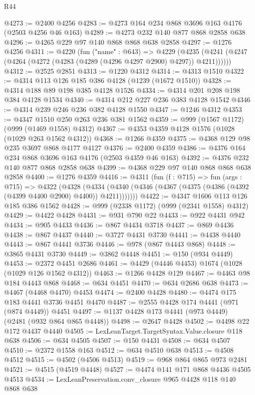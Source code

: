 \begin{lexlean}{R44}
\begin{coremodule}
@4273 := @2400 @4256
@4283 := @4273 @164 @234 @868 @3696 @163 @4176 (@2503 @4256 @46 @163)
@4289 := @4273 @232 @140 @877 @868 @2858 @638
@4296 := @4265 @229 @97 @140 @868 @868 @638 @2858
@4297 := @1276 @4256
@4311 := @4220
    (fun ("name" : @643) =>
    @4229 (@4235 (@4241 (@4247 (@4264 (@4272 (@4283 (@4289 (@4296 @4297 @2900) @4297)) @4211))))))
@4312 := @2525 @2851
@4313 := @1220 @4312
@4314 := @4313 @1510
@4322 := @4314 @113 @126 @185 @386 @4128 (@1239 (@1672 @1510))
@4328 := @4314 @188 @89 @198 @385 @4128 @1526
@4334 := @4314 @201 @208 @198 @384 @4128 @1534
@4340 := @4314 @212 @227 @236 @383 @4128 @1542
@4346 := @4314 @239 @246 @236 @382 @4128 @1550
@4347 := @1246 @4312
@4353 := @4347 @1510 @250 @263 @236 @381 @1562
@4359 := @999 (@1567 @1172) (@999 (@1469 @1558) @4312)
@4367 := @4353 @4359 @4128 @1576 (@1028 (@1029 @263 @1562 @4312))
@4368 := @1266 @4359
@4375 := @4368 @129 @98 @235 @3697 @868 @4177 @4127
@4376 := @2400 @4359
@4386 := @4376 @164 @234 @868 @3696 @163 @4176 (@2503 @4359 @46 @163)
@4392 := @4376 @232 @140 @877 @868 @2858 @638
@4399 := @4368 @229 @97 @140 @868 @868 @638 @2858
@4400 := @1276 @4359
@4416 := @4311
    (fun (f : @715) =>
    fun (args : @715) =>
    @4322
      (@4328
        (@4334 (@4340 (@4346 (@4367 (@4375 (@4386 (@4392 (@4399 @4400 @2900) @4400)) @4211)))))))
@4422 := @4347 @1606 @113 @126 @185 @386 @1562
@4428 := @999 (@2338 @1172) (@999 (@2341 @1558) @4312)
@4429 := @4422 @4428
@4431 := @931 @790 @22
@4433 := @922 @4431 @942
@4434 := @905 @4433
@4436 := @867 @4434 @3718
@4437 := @869 @4436
@4438 := @867 @4437
@4440 := @3727 @4431 @3730
@4441 := @4438 @4440
@4443 := @867 @4441 @3736
@4446 := @978 (@867 @4443 @868)
@4448 := @3865 @4431 @3730
@4449 := @3862 @4448
@4451 := @150 (@934 @4449)
@4453 := @2372 @4451 @2686
@4461 := @4429 (@4446 @4453) @1674 (@1028 (@1029 @126 @1562 @4312))
@4463 := @1266 @4428 @129
@4467 := @4463 @98 @184 @4443 @868
@4468 := @634 @4451
@4470 := @634 @2686 @638
@4473 := @4467 (@4468 @4470) @4453
@4474 := @2400 @4428
@4480 := @4474 @175 @183 @4441 @3736 @4451 @4470
@4487 := @2555 @4428 @174 @4441 (@971 (@874 @4449)) @4451
@4497 := @1137 @4428 @173 @4441 (@973 @4449) (@2481 (@932 @864 @865 @4448))
@4498 := @2647 @4428
@4502 := @4498 @22 @172 @4437 @4440
@4505 := LexLeanTarget.TargetSyntax.Value.closure @118 @638
@4506 := @634 @4505
@4507 := @150 @4431
@4508 := @634 @4507
@4510 := @2372 @1558 @163
@4512 := @634 @4510 @638
@4513 := @4508 @4512
@4515 := @4502 (@4506 @4513)
@4519 := @968 @864 @865 @973 @2481
@4521 := @4515 (@4519 @4448)
@4527 := @4474 @141 @171 @868 @4436 @4505 @4513
@4534 := LexLeanPreservation.conv_closure @965 @4428 @118 @140 @868 @638

\end{coremodule}
\end{lexlean}
